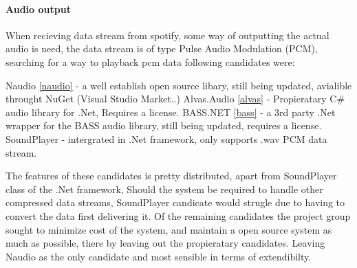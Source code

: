 	\paragraph{Audio output}
	When recieving data stream from spotify, some way of outputting the actual audio is need, the data stream is of type Pulse Audio Modulation (PCM), searching for a way to playback pcm data following candidates were:

	Naudio \cref{naudio} - a well establish open source libary, still being updated, avialible throught NuGet (Visual Studio Market..)
	Alvas.Audio \cref{alvas} - Propieratary C\# audio library for .Net, Requires a license.
	BASS.NET \cref{bass} - a 3rd party .Net wrapper for the BASS audio library, still being updated, requires a license.
	SoundPlayer - intergrated in .Net framework, only supports .wav PCM data stream.

	The features of these candidates is pretty distributed, apart from SoundPlayer class of the .Net framework, Should the system be required to handle other compressed data streams, SoundPlayer candicate would strugle due to having to convert the data first delivering it. Of the remaining candidates the project group sought to minimize cost of the system, and maintain a open source system as much as possible, there by leaving out the propieratary candidates. Leaving Naudio as the only candidate and most sensible in terms of extendibilty.